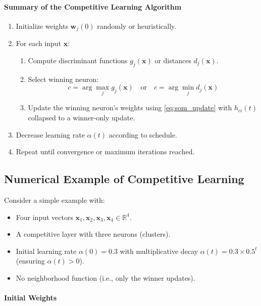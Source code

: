 \paragraph{Summary of the Competitive Learning Algorithm}

\begin{enumerate}
    \item Initialize weights \(\mathbf{w}_j(0)\) randomly or heuristically.
    \item For each input \(\mathbf{x}\):
    \begin{enumerate}
        \item Compute discriminant functions \(g_j(\mathbf{x})\) or distances \(d_j(\mathbf{x})\).
        \item Select winning neuron:
        \[
        c = \arg \max_j g_j(\mathbf{x}) \quad \text{or} \quad c = \arg \min_j d_j(\mathbf{x})
        \]
        \item Update the winning neuron's weights using \eqref{eq:som_update} with \(h_{ci}(t)\) collapsed to a winner-only update.
    \end{enumerate}
    \item Decrease learning rate \(\alpha(t)\) according to schedule.
    \item Repeat until convergence or maximum iterations reached.
\end{enumerate}

\subsection{Numerical Example of Competitive Learning}
\label{sec:som_numerical_example_of_competitive_learning}

Consider a simple example with:

\begin{itemize}
    \item Four input vectors \(\mathbf{x}_1, \mathbf{x}_2, \mathbf{x}_3, \mathbf{x}_4 \in \mathbb{R}^4\).
    \item A competitive layer with three neurons (clusters).
    \item Initial learning rate \(\alpha(0) = 0.3\) with multiplicative decay \(\alpha(t) = 0.3 \times 0.5^{t}\) (ensuring \(\alpha(t) > 0\)).
    \item No neighborhood function (i.e., only the winner updates).
\end{itemize}

\paragraph{Initial Weights}

